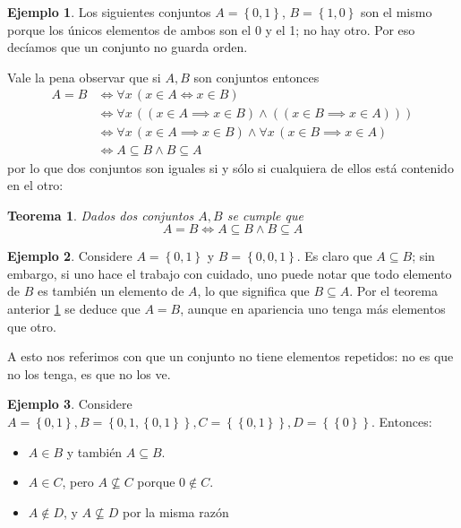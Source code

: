 \documentclass{book}
\newcommand{\set}[1]{\left\lbrace #1 \right\rbrace }
\newtheorem{thm}{Teorema}[chapter]
\theoremstyle{definition}
\newtheorem{ejm}{Ejemplo}[chapter]
\begin{document}
\begin{ejm}
	Los siguientes conjuntos $A=\set{0,1}$, $B=\set{1,0}$ son el mismo porque los únicos elementos de ambos son el 0 y el 1; no hay otro. Por eso decíamos que un conjunto no guarda orden.
\end{ejm}

Vale la pena observar que si $A,B$ son conjuntos entonces 
\begin{align*}
	A = B 
	&\iff \forall x\, \left(x\in A \iff x \in B\right)\\
	&\iff  \forall x\, \left( (x\in A \implies x \in B) \wedge ((x\in B \implies x \in A))\right) \\
	&\iff \forall x\, (x\in A \implies x \in B) \wedge \forall x\, (x\in B \implies x \in A)\\
	&\iff A \subseteq B \wedge B \subseteq A
\end{align*}
por lo que dos conjuntos son iguales si y sólo si cualquiera de ellos está contenido en el otro:
\begin{thm}\label{thm_igualdadConjuntos}
	Dados dos conjuntos $A,B$ se cumple que
	\[A = B \iff A \subseteq B \wedge B \subseteq A \]
\end{thm}

\begin{ejm}
	Considere $A = \set{0,1}$ y $B=\set{0,0,1}$. Es claro que $A \subseteq B$; sin embargo, si uno hace el trabajo con cuidado, uno puede notar que todo elemento de $B$ es también un elemento de $A$, lo que significa que $B \subseteq A$.
	Por el teorema anterior \ref{thm_igualdadConjuntos} se deduce que $A=B$, aunque en apariencia uno tenga más elementos que otro.
	
	A esto nos referimos con que un conjunto no tiene elementos repetidos: no es que no los tenga, es que no los ve.
\end{ejm}


\begin{ejm}
	Considere $A=\set{0,1}, B=\set{0,1,\set{0,1}}, C=\set{\set{0,1}}, D= \set{\set{0}}$. Entonces:
	\begin{itemize}
		\item $A\in B$ y también $A\subseteq B$.
		\item $A\in C$, pero $A \not \subseteq C$ porque $0 \notin C$.
		\item $A\notin D$, y $A\not \subseteq D$ por la misma razón
	\end{itemize}
\end{ejm}
\end{document}
